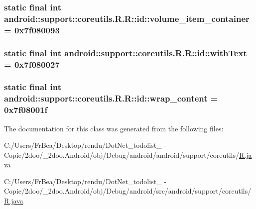 \hypertarget{classandroid_1_1support_1_1coreutils_1_1_r_1_1id_d675cb9b7a4ff85579a11a8cffd2ab9c}{
\subsubsection[{volume\_\-item\_\-container}]{\setlength{\rightskip}{0pt plus 5cm}static final int android::support::coreutils.R.R::id::volume\_\-item\_\-container = 0x7f080093}}
\label{classandroid_1_1support_1_1coreutils_1_1_r_1_1id_d675cb9b7a4ff85579a11a8cffd2ab9c}


\hypertarget{classandroid_1_1support_1_1coreutils_1_1_r_1_1id_3fa4dfa7f25aedfc02c12590f3647ba8}{
\subsubsection[{withText}]{\setlength{\rightskip}{0pt plus 5cm}static final int android::support::coreutils.R.R::id::withText = 0x7f080027}}
\label{classandroid_1_1support_1_1coreutils_1_1_r_1_1id_3fa4dfa7f25aedfc02c12590f3647ba8}


\hypertarget{classandroid_1_1support_1_1coreutils_1_1_r_1_1id_47d786d0ec1b4164582b9ff136377972}{
\subsubsection[{wrap\_\-content}]{\setlength{\rightskip}{0pt plus 5cm}static final int android::support::coreutils.R.R::id::wrap\_\-content = 0x7f08001f}}
\label{classandroid_1_1support_1_1coreutils_1_1_r_1_1id_47d786d0ec1b4164582b9ff136377972}




The documentation for this class was generated from the following files:\begin{CompactItemize}
\item 
C:/Users/FrBea/Desktop/rendu/DotNet\_\-todolist\_ - Copie/2doo/\_\-2doo.Android/obj/Debug/android/android/support/coreutils/\hyperlink{android_2support_2coreutils_2_r_8java}{R.java}\item 
C:/Users/FrBea/Desktop/rendu/DotNet\_\-todolist\_ - Copie/2doo/\_\-2doo.Android/obj/Debug/android/src/android/support/coreutils/\hyperlink{src_2android_2support_2coreutils_2_r_8java}{R.java}\end{CompactItemize}
